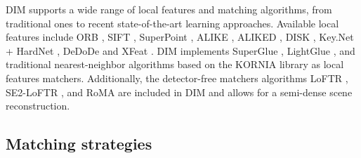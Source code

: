 DIM supports a wide range of local features and matching algorithms, from traditional ones to recent state-of-the-art learning approaches. 
Available local features include ORB \citep{Rublee2011}, SIFT \citep{Lowe2004}, SuperPoint \citep{DeTone_2018}, ALIKE \citep{zhao2022alike}, ALIKED \citep{zhao2023aliked}, DISK \citep{tyszkiewicz2020disk}, Key.Net \citep{barrosolaguna2019keynet} + HardNet \citep{pultar2020improving}, DeDoDe \citep{edstedt2024dedode} and XFeat \cite{potje2024cvpr}.
DIM implements SuperGlue \citep{sarlin2020superglue}, LightGlue \citep{lindenberger2023lightglue}, and traditional nearest-neighbor algorithms based on the KORNIA library \citep{riba2019kornia} as local features matchers. 
Additionally, the detector-free matchers algorithms LoFTR \citep{sun2021_loftr}, SE2-LoFTR \citep{Bkman2022_se2loftr}, and RoMA \citep{edstedt2023roma} are included in DIM and allows for a semi-dense scene reconstruction.

\subsection{Matching strategies}\label{sec:5:matching_stategies}

